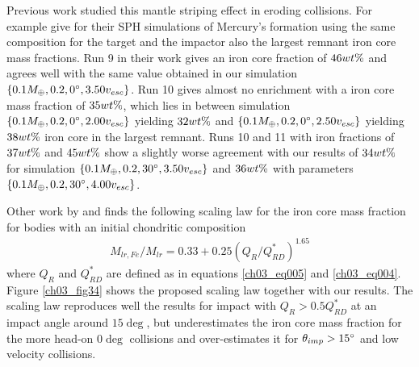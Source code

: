 Previous work studied this mantle striping effect in eroding collisions. For example \cite{Benz:1988p3336} give for their SPH simulations of Mercury's formation using the same composition for the target and the impactor also the largest remnant iron core mass fractions. Run 9 in their work gives an iron core fraction of $46 wt\mathrm{\%}$ and agrees well with the same value obtained in our simulation $\{ 0.1 M_{\oplus}, 0.2,  0 ^\circ, 3.50 v_{esc} \}$. Run 10 gives almost no enrichment with a iron core mass fraction of $35 wt\mathrm{\%}$, which lies in between simulation $\{ 0.1 M_{\oplus}, 0.2,  0 ^\circ, 2.00 v_{esc} \}$ yielding $32 wt\mathrm{\%}$ and  $\{ 0.1 M_{\oplus}, 0.2,  0 ^\circ, 2.50 v_{esc} \}$ yielding $38 wt\mathrm{\%}$ iron core in the largest remnant. Runs 10 and 11 with iron fractions of $37 wt\mathrm{\%}$ and $45 wt\mathrm{\%}$ show a slightly worse agreement with our results of $34 wt\mathrm{\%}$ for simulation $\{ 0.1 M_{\oplus}, 0.2,  30 ^\circ, 3.50 v_{esc} \}$ and $36 wt\mathrm{\%}$ with parameters $\{ 0.1 M_{\oplus}, 0.2,  30 ^\circ, 4.00 v_{esc} \}$.

Other work by \cite{2009ApJ...700L.118M} and \cite{2010ApJ...712L..73M} finds the following scaling law for the iron core mass fraction for bodies with an initial chondritic composition 
\begin{align}
M_{lr, Fe} / M_{lr} = 0.33 + 0.25 ( Q_R / Q^*_{RD} )^{1.65}
\end{align}
where $Q_R$ and $Q^*_{RD}$ are defined as in equations \ref{ch03_eq005} and \ref{ch03_eq004}. Figure \ref{ch03_fig34} shows the proposed scaling law together with our results. The scaling law reproduces well the results for impact with $Q_R > 0.5 Q^*_{RD}$ at an impact angle around $15 \deg$, but underestimates the iron core mass fraction for the more head-on $0\deg$ collisions and over-estimates it for $\theta_{imp} > 15 ^\circ$ and low velocity collisions.

